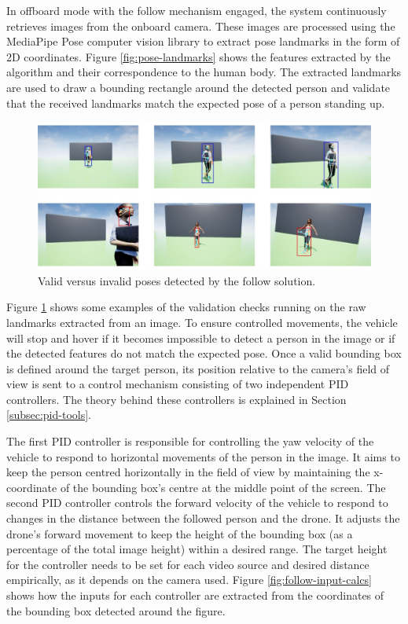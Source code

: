 In offboard mode with the follow mechanism engaged, the system continuously retrieves images from the onboard camera. These images are processed using the MediaPipe Pose \cite{mp-pose-paper} computer vision library to extract pose landmarks in the form of 2D coordinates. 
Figure \ref{fig:pose-landmarks} shows the features extracted by the algorithm and their correspondence to the human body.
The extracted landmarks are used to draw a bounding rectangle around the detected person and validate that the received landmarks match the expected pose of a person standing up.

\begin{figure}
  \centering
  \includegraphics[width=\textwidth, keepaspectratio]{img/pose-validation.jpg}
  \caption{Valid versus invalid poses detected by the follow solution.}
  \label{fig:pose-validation}
\end{figure}

Figure \ref{fig:pose-validation} shows some examples of the validation checks running on the raw landmarks extracted from an image.
To ensure controlled movements, the vehicle will stop and hover if it becomes impossible to detect a person in the image or if the detected features do not match the expected pose. Once a valid bounding box is defined around the target person, its position relative to the camera's field of view is sent to a control mechanism consisting of two independent PID controllers. The theory behind these controllers is explained in Section \ref{subsec:pid-tools}.

The first PID controller is responsible for controlling the yaw velocity of the vehicle to respond to horizontal movements of the person in the image. It aims to keep the person centred horizontally in the field of view by maintaining the x-coordinate of the bounding box's centre at the middle point of the screen.
The second PID controller controls the forward velocity of the vehicle to respond to changes in the distance between the followed person and the drone. It adjusts the drone's forward movement to keep the height of the bounding box (as a percentage of the total image height) within a desired range. The target height for the controller needs to be set for each video source and desired distance empirically, as it depends on the camera used.
Figure \ref{fig:follow-input-calcs} shows how the inputs for each controller are extracted from the coordinates of the bounding box detected around the figure.

